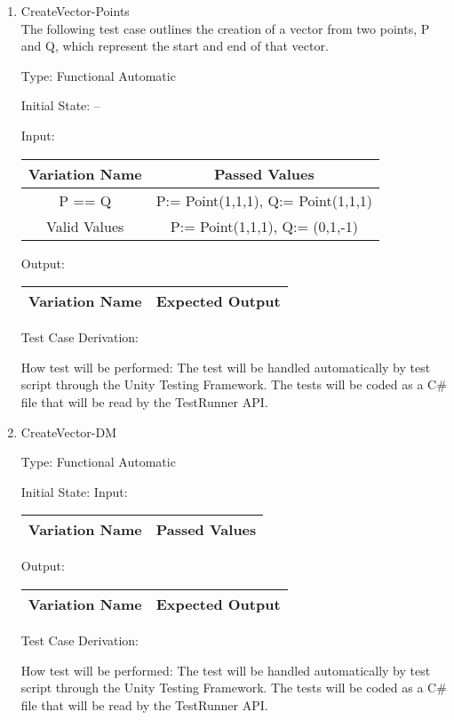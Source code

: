 \documentclass[12pt, titlepage]{article}
\begin{document}
\begin{enumerate}
	
	\item{CreateVector-Points\\}
	The following test case outlines the creation of a vector from two points, 
	P and Q, which represent the start and end of that vector.
	
	Type: Functional Automatic
	
	Initial State: --
	
	Input: 
	\begin{tabular}{|c|c|}
		\hline
		\textbf{Variation Name} & \textbf{Passed Values}\\
		\hline
		P == Q & P:= Point(1,1,1), Q:= Point(1,1,1)\\
		Valid Values & P:= Point(1,1,1), Q:= (0,1,-1)\\
		\hline
	\end{tabular}
	
	Output: 
	\begin{tabular}{|c|c|}
		\hline
		\textbf{Variation Name} & \textbf{Expected Output}\\
		\hline

		\hline
	\end{tabular}
	
	Test Case Derivation: 
	
	How test will be performed: The test will be handled automatically by test 
	script through the Unity Testing Framework. The tests will be coded as a 
	C\# file that will be read by the TestRunner API.
	
	\item{CreateVector-DM\\}
	
	Type: Functional Automatic
	
	Initial State: 
	Input: 
	\begin{tabular}{|c|c|}
		\hline
		\textbf{Variation Name} & \textbf{Passed Values}\\
		\hline

		\hline
	\end{tabular}
	
	Output:
	\begin{tabular}{|c|c|}
		\hline
		\textbf{Variation Name} & \textbf{Expected Output}\\
		\hline
	
		\hline
	\end{tabular}
	
	Test Case Derivation: 
	
	How test will be performed: The test will be handled automatically by test 
	script through the Unity Testing Framework. The tests will be coded as a 
	C$\#$ file that will be read by the TestRunner API.  
	
\end{enumerate}
\end{document}
